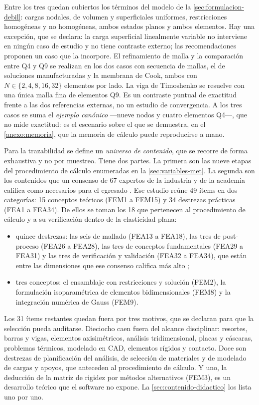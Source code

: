 Entre los tres quedan cubiertos los términos del modelo de la \autoref{sec:formulacion-debil}: cargas nodales, de volumen y superficiales uniformes, restricciones homogéneas y no homogéneas, ambos estados planos y ambos elementos. Hay una excepción, que se declara: la carga superficial linealmente variable no interviene en ningún caso de estudio y no tiene contraste externo; las recomendaciones proponen un caso que la incorpore. El refinamiento de malla y la comparación entre Q4 y Q9 se realizan en los dos casos con secuencia de mallas, el de soluciones manufacturadas y la membrana de Cook, ambos con $N\in\{2,4,8,16,32\}$ elementos por lado. La viga de Timoshenko se resuelve con una única malla fina de elementos Q9. Es un contraste puntual de exactitud frente a las dos referencias externas, no un estudio de convergencia. A los tres casos se suma el \emph{ejemplo canónico} —nueve nodos y cuatro elementos Q4—, que no mide exactitud: es el escenario sobre el que se demuestra, en el \autoref{anexo:memoria}, que la memoria de cálculo puede reproducirse a mano.

Para la trazabilidad se define un \emph{universo de contenido}, que se recorre de forma exhaustiva y no por muestreo. Tiene dos partes. La primera son las nueve etapas del procedimiento de cálculo enumeradas en la \autoref{sec:variables-met}. La segunda son los contenidos que un consenso de 67 expertos de la industria y de la academia califica como necesarios para el egresado \autocite[pp.~1162-1163]{perezsantiago2023fem}. Ese estudio reúne 49 ítems en dos categorías: 15 conceptos teóricos (FEM1 a FEM15) y 34 destrezas prácticas (FEA1 a FEA34). De ellos se toman los 18 que pertenecen al procedimiento de cálculo y a su verificación dentro de la elasticidad plana:
\begin{itemize}
    \item quince destrezas: las seis de mallado (FEA13 a FEA18), las tres de post-proceso (FEA26 a FEA28), las tres de conceptos fundamentales (FEA29 a FEA31) y las tres de verificación y validación (FEA32 a FEA34), que están entre las dimensiones que ese consenso califica más alto \autocite[p.~1168]{perezsantiago2023fem};
    \item tres conceptos: el ensamblaje con restricciones y solución (FEM2), la formulación isoparamétrica de elementos bidimensionales (FEM8) y la integración numérica de Gauss (FEM9).
\end{itemize}
Los 31 ítems restantes quedan fuera por tres motivos, que se declaran para que la selección pueda auditarse. Dieciocho caen fuera del alcance disciplinar: resortes, barras y vigas, elementos axisimétricos, análisis tridimensional, placas y cáscaras, problemas térmicos, modelado en CAD, elementos rígidos y contacto. Doce son destrezas de planificación del análisis, de selección de materiales y de modelado de cargas y apoyos, que anteceden al procedimiento de cálculo. Y uno, la deducción de la matriz de rigidez por métodos alternativos (FEM3), es un desarrollo teórico que el software no expone. La \autoref{sec:contenido-didactico} los lista uno por uno.

